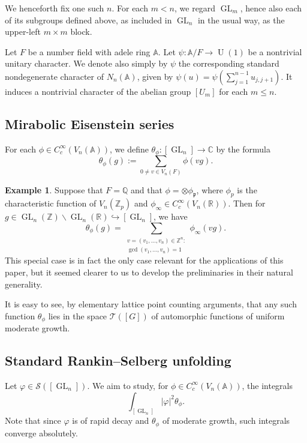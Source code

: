 \documentclass[reqno]{amsart}
\DeclareMathOperator{\GL}{GL}
\DeclareMathOperator{\U}{U}
\theoremstyle{plain} \newtheorem{theorem} {Theorem}
\theoremstyle{definition} \newtheorem{definition} [theorem] {Definition}
\newtheorem{example} [theorem] {Example}
\theoremstyle{itplain} %
\numberwithin{equation}{section}
\numberwithin{theorem}{section}
\renewcommand{\leq}{\leqslant}
\begin{document}
We henceforth fix one such $n$.  For each $m < n$, we regard $\GL_m$, hence also each of its subgroups defined above, as included in $\GL_n$ in the usual way, as the upper-left $m \times m$ block.

Let $F$ be a number field with adele ring $\mathbb{A}$.  Let $\psi : \mathbb{A}/F \rightarrow \U(1)$ be a nontrivial unitary character.  We denote also simply by $\psi$ the corresponding standard nondegenerate character of $N_n(\mathbb{A})$, given by $\psi(u) = \psi(\sum_{j=1}^{n-1} u_{j,j+1})$.  It induces a nontrivial character of the abelian group $[U_m]$ for each $m \leq n$.

\subsection{Mirabolic Eisenstein series}
For each $\phi \in C_c^\infty(V_n(\mathbb{A}))$, we define $\theta_\phi : [\GL_n] \rightarrow \mathbb{C}$ by the formula
\begin{equation*}
  \theta_\phi(g) := \sum _{0 \neq v \in V_n(F)} \phi(v g).
\end{equation*}
\begin{example}
  Suppose that $F = \mathbb{Q}$ and that $\phi = \otimes \phi_\mathfrak{p}$, where $\phi_p$ is the characteristic function of $V_n(\mathbb{Z}_p)$ and $\phi_\infty \in C_c^\infty(V_n(\mathbb{R}))$.  Then for $g \in \GL_n(\mathbb{Z}) \backslash \GL_n(\mathbb{R}) \hookrightarrow [\GL_n]$, we have
  \begin{equation*}
    \theta_\phi(g) =
    \sum _{
      \substack{
        v = (v_1,\dotsc,v_n) \in \mathbb{Z}^n :  
        \\
         \gcd(v_1,\dotsc,v_n) = 1
      }
    } \phi_\infty(v g).
  \end{equation*}
  This special case is in fact the only case relevant for the applications of this paper, but it seemed clearer to us to develop the preliminaries in their natural generality.
\end{example}
It is easy to see, by elementary lattice point counting arguments, that any such function $\theta_\phi$ lies in the space $\mathcal{T}([G])$ of automorphic functions of uniform moderate growth.

\subsection{Standard Rankin--Selberg unfolding}\label{sec:stand-rank-selb}
Let $\varphi \in \mathcal{S}([\GL_n])$.  We aim to study, for $\phi \in C_c^\infty(V_n(\mathbb{A}))$, the integrals
\begin{equation*}
  \int _{[\GL_n]} |\varphi|^2 \theta_\phi.
\end{equation*}
Note that since $\varphi$ is of rapid decay and $\theta_\phi$ of moderate growth, such integrals converge absolutely.
\end{document}
